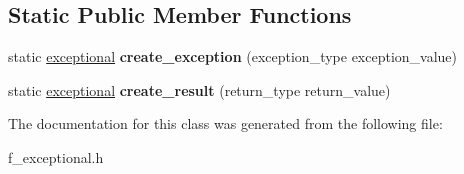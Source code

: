 \subsection*{Static Public Member Functions}
\begin{DoxyCompactItemize}
\item 
\mbox{\label{classfsl_1_1str_1_1exceptional_a68f95ab01704bb8a1336eac8bb3232fb}} 
static \mbox{\hyperlink{classfsl_1_1str_1_1exceptional}{exceptional}} {\bfseries create\+\_\+exception} (exception\+\_\+type exception\+\_\+value)
\item 
\mbox{\label{classfsl_1_1str_1_1exceptional_a44880b63ffead0c13caf4dabf7ba0215}} 
static \mbox{\hyperlink{classfsl_1_1str_1_1exceptional}{exceptional}} {\bfseries create\+\_\+result} (return\+\_\+type return\+\_\+value)
\end{DoxyCompactItemize}


The documentation for this class was generated from the following file\+:\begin{DoxyCompactItemize}
\item 
f\+\_\+exceptional.\+h\end{DoxyCompactItemize}
